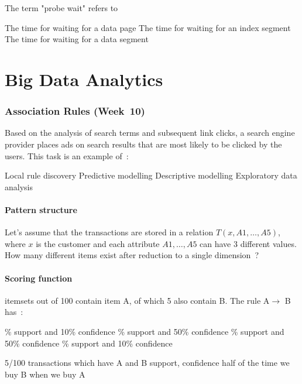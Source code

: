 \documentclass[12pt,a4paper,answers]{exam} %
\begin{document}
\begin{flushleft}
\begin{multicols*}{2}
\begin{questions}
\question The term "probe wait" refers to
\begin{checkboxes}
\choice The time for waiting for a data page
\CorrectChoice The time for waiting for an index segment
\choice The time for waiting for a data segment
\end{checkboxes}

\part{Big Data Analytics}
\section{Association Rules (Week~10)}
\question Based on the analysis of search terms and subsequent link clicks, a search engine provider places ads on  search results that are most likely to be clicked by the users.
This task is an example of~:
\begin{checkboxes}
\choice Local rule discovery
\CorrectChoice Predictive modelling
\choice Descriptive modelling
\choice Exploratory data analysis
\end{checkboxes}

\subsection{Pattern structure}
\question Let’s assume that the transactions are stored in a relation $T(x, A1, \ldots, A5)$, where $x$ is the customer and each attribute $A1, \ldots, A5$ can have 3 different values. How many different items exist after reduction to a single dimension~?
\begin{checkboxes}
\end{checkboxes}

\subsection{Scoring function}
 itemsets out of 100 contain item A, of which 5 also contain B. The rule A$\rightarrow$ B has~:
\begin{checkboxes}
\% support and 10\% confidence
\% support and 50\% confidence
\% support and 50\% confidence
\% support and 10\% confidence
\end{checkboxes}
\begin{solution}
5/100 transactions which have A and B support, confidence half of the time we buy B when we buy A
\end{solution}


\end{questions}
\end{multicols*}
\end{flushleft}
\end{document}
